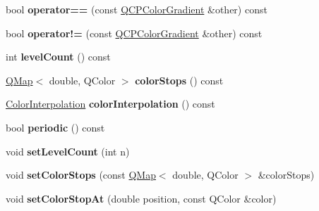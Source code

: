 \begin{DoxyCompactItemize}
\item 
bool {\bfseries operator==} (const \hyperlink{class_q_c_p_color_gradient}{Q\+C\+P\+Color\+Gradient} \&other) const \hypertarget{class_q_c_p_color_gradient_aada47d8206bf2cec77462653bf471c13}{}\label{class_q_c_p_color_gradient_aada47d8206bf2cec77462653bf471c13}

\item 
bool {\bfseries operator!=} (const \hyperlink{class_q_c_p_color_gradient}{Q\+C\+P\+Color\+Gradient} \&other) const \hypertarget{class_q_c_p_color_gradient_ac641f5d2dc1686201d3cb602c871791d}{}\label{class_q_c_p_color_gradient_ac641f5d2dc1686201d3cb602c871791d}

\item 
int {\bfseries level\+Count} () const \hypertarget{class_q_c_p_color_gradient_ae7537a8e6d0fed3f1928328062bb0f4e}{}\label{class_q_c_p_color_gradient_ae7537a8e6d0fed3f1928328062bb0f4e}

\item 
\hyperlink{class_q_map}{Q\+Map}$<$ double, Q\+Color $>$ {\bfseries color\+Stops} () const \hypertarget{class_q_c_p_color_gradient_a64f8aba7826f9c6363aacff8376cef37}{}\label{class_q_c_p_color_gradient_a64f8aba7826f9c6363aacff8376cef37}

\item 
\hyperlink{class_q_c_p_color_gradient_ac5dca17cc24336e6ca176610e7f77fc1}{Color\+Interpolation} {\bfseries color\+Interpolation} () const \hypertarget{class_q_c_p_color_gradient_a731616fabe6f2e33f71f58dd382359d8}{}\label{class_q_c_p_color_gradient_a731616fabe6f2e33f71f58dd382359d8}

\item 
bool {\bfseries periodic} () const \hypertarget{class_q_c_p_color_gradient_a860b7048f877195d2a0fb8d5a7cf5d73}{}\label{class_q_c_p_color_gradient_a860b7048f877195d2a0fb8d5a7cf5d73}

\item 
void {\bfseries set\+Level\+Count} (int n)\hypertarget{class_q_c_p_color_gradient_a18da587eb4f7fc788ea28ba15b6a12de}{}\label{class_q_c_p_color_gradient_a18da587eb4f7fc788ea28ba15b6a12de}

\item 
void {\bfseries set\+Color\+Stops} (const \hyperlink{class_q_map}{Q\+Map}$<$ double, Q\+Color $>$ \&color\+Stops)\hypertarget{class_q_c_p_color_gradient_a724e828aa6f0ba5011a9392477c35d3a}{}\label{class_q_c_p_color_gradient_a724e828aa6f0ba5011a9392477c35d3a}

\item 
void {\bfseries set\+Color\+Stop\+At} (double position, const Q\+Color \&color)\hypertarget{class_q_c_p_color_gradient_a3b48be5e78079db1bb2a1188a4c3390e}{}\label{class_q_c_p_color_gradient_a3b48be5e78079db1bb2a1188a4c3390e}


\end{DoxyCompactItemize}
